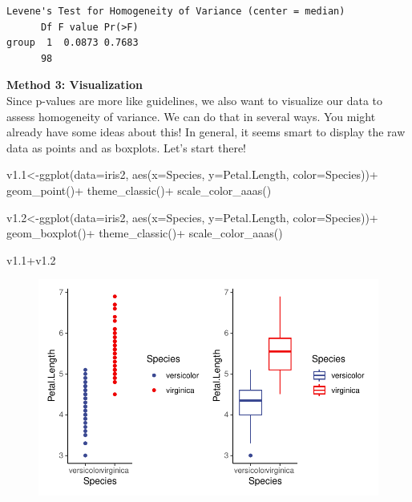 \documentclass[
  letterpaper,
  DIV=11,
  numbers=noendperiod]{scrartcl}
\newenvironment{Shaded}{\begin{snugshade}}{\end{snugshade}}
\newcommand{\AttributeTok}[1]{\textcolor[rgb]{0.40,0.45,0.13}{#1}}
\newcommand{\FloatTok}[1]{\textcolor[rgb]{0.68,0.00,0.00}{#1}}
\newcommand{\FunctionTok}[1]{\textcolor[rgb]{0.28,0.35,0.67}{#1}}
\newcommand{\NormalTok}[1]{\textcolor[rgb]{0.00,0.23,0.31}{#1}}
\newcommand{\OtherTok}[1]{\textcolor[rgb]{0.00,0.23,0.31}{#1}}
\newcommand{\SpecialCharTok}[1]{\textcolor[rgb]{0.37,0.37,0.37}{#1}}
\begin{document}
\begin{verbatim}
Levene's Test for Homogeneity of Variance (center = median)
      Df F value Pr(>F)
group  1  0.0873 0.7683
      98               
\end{verbatim}

\hfill\break
\textbf{Method 3: Visualization}\\
Since p-values are more like guidelines, we also want to visualize our
data to assess homogeneity of variance. We can do that in several ways.
You might already have some ideas about this! In general, it seems smart
to display the raw data as points and as boxplots. Let's start there!

\begin{Shaded}
\begin{Highlighting}[]
\NormalTok{v1}\FloatTok{.1}\OtherTok{\textless{}{-}}\FunctionTok{ggplot}\NormalTok{(}\AttributeTok{data=}\NormalTok{iris2, }\FunctionTok{aes}\NormalTok{(}\AttributeTok{x=}\NormalTok{Species, }\AttributeTok{y=}\NormalTok{Petal.Length, }\AttributeTok{color=}\NormalTok{Species))}\SpecialCharTok{+}
  \FunctionTok{geom\_point}\NormalTok{()}\SpecialCharTok{+}
  \FunctionTok{theme\_classic}\NormalTok{()}\SpecialCharTok{+}
  \FunctionTok{scale\_color\_aaas}\NormalTok{()}

\NormalTok{v1}\FloatTok{.2}\OtherTok{\textless{}{-}}\FunctionTok{ggplot}\NormalTok{(}\AttributeTok{data=}\NormalTok{iris2, }\FunctionTok{aes}\NormalTok{(}\AttributeTok{x=}\NormalTok{Species, }\AttributeTok{y=}\NormalTok{Petal.Length, }\AttributeTok{color=}\NormalTok{Species))}\SpecialCharTok{+}
  \FunctionTok{geom\_boxplot}\NormalTok{()}\SpecialCharTok{+}
  \FunctionTok{theme\_classic}\NormalTok{()}\SpecialCharTok{+}
  \FunctionTok{scale\_color\_aaas}\NormalTok{()}

\NormalTok{v1}\FloatTok{.1}\SpecialCharTok{+}\NormalTok{v1}\FloatTok{.2}
\end{Highlighting}
\end{Shaded}

\begin{figure}[H]

{\centering \includegraphics{t_test_files/figure-pdf/unnamed-chunk-11-1.pdf}

}

\end{figure}
\end{document}
